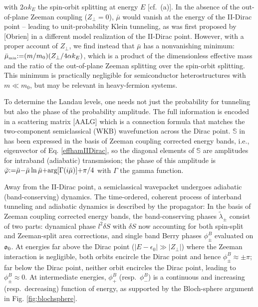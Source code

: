 \documentclass[aps, prb, showpacs, twocolumn, notitlepage, superscriptaddress]{revtex4-1}
\begin{document}
with $2\alpha k_E$ the spin-orbit splitting at energy $E$ [cf.\ (a)]. In the absence of the out-of-plane Zeeman coupling ($Z_\perp{=}0$), $\bar{\mu}$ would vanish at the energy of the II-Dirac point -- leading to unit-probability Klein tunneling, as was first proposed by [Obrien] in a different model realization of the II-Dirac point. However, with a proper account of $Z_\perp$, we find instead that $\bar{\mu}$ has a nonvanishing minimum: $\bar{\mu}_{\scriptscriptstyle{\text{min}}}{:}{=} ( m/m_0)(Z_\perp/4\alpha k_{E})$, which is a product of the dimensionless effective mass and the ratio of the out-of-plane Zeeman splitting over the spin-orbit splitting. This minimum is practically negligible for  semiconductor heterostructures with $m{\ll}m_0$, but may be relevant in heavy-fermion systems. 


To determine the Landau levels, one needs not just the probability for tunneling but also the phase of the probability amplitude. The full information is encoded in a scattering matrix [AALG]
which is a connection formula that matches the two-component semiclassical (WKB) wavefunction across the Dirac point. $\mathbb{S}$ in  has been expressed in the basis of Zeeman coupling corrected energy bands, i.e., eigenvector of Eq. \ref{effhamIIDirac}, so the diagonal elements of $\mathbb{S}$ are amplitudes for intraband (adiabatic) transmission; the phase of this amplitude is $\bar{\varphi}{:}{=}\bar{\mu}{-}\bar{\mu}\ln\bar{\mu}{+}\text{arg}[\Gamma(i\bar{\mu})]{+}\pi/4$ with $\Gamma$ the gamma function.

Away from the II-Dirac point, a semiclassical wavepacket undergoes adiabatic (band-conserving) dynamics. The time-ordered, coherent process of interband tunneling and adiabatic dynamics is described by the propagator:
In the basis of Zeeman coupling corrected energy bands, the band-conserving phases $\tilde{\lambda}_{\pm}$ consist of two parts: dynamical phase $l^2 \delta S$ with $\delta S$ now accounting for both spin-split and Zeeman-split area corrections, and single band Berry phases $\phi^B_\pm$ evaluated on $\mathfrak{o}_0$. At energies far above the Dirac point ($|E{-}\epsilon_0|{\gg}|Z_{\perp}|$) where the Zeeman interaction is negligible, both orbits encircle the Dirac point and hence $\phi_{\pm}^B{\approx}{\pm}\pi$; far below the Dirac point, neither orbit encircles the Dirac point, leading to $\phi_{\pm}^B{\approx}0$. At intermediate energies, $\phi_{+}^B$ (resp.\ $\phi_{-}^B$) is a continuous and increasing (resp.\ decreasing) function of energy, as supported by the Bloch-sphere argument in Fig. \ref{fig:blochsphere}.
\end{document}
